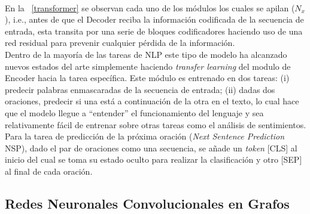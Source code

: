 	\\
	En la \figurename~\ref{transformer} se observan cada uno de los módulos los cuales se apilan ($N_x$), i.e., antes de que el Decoder reciba la información codificada de la secuencia de entrada, esta transita por una serie de bloques codificadores haciendo uso de una red residual para prevenir cualquier pérdida de la información.
	\\
	Dentro de la mayoría de las tareas de NLP este tipo de modelo ha alcanzado nuevos estados del arte simplemente haciendo \textit{transfer learning} del modulo de Encoder hacia la tarea específica. Este módulo es entrenado en dos tareas: (i) predecir palabras enmascaradas de la secuencia de entrada; (ii) dadas dos oraciones, predecir si una está a continuación de la otra en el texto, lo cual hace que el modelo llegue a ``entender'' el funcionamiento del lenguaje y sea relativamente fácil de entrenar sobre otras tareas como el análisis de sentimientos. Para la tarea de predicción de la próxima oración (\textit{Next Sentence Prediction} NSP), dado el par de oraciones como una secuencia, se añade un \textit{token} [CLS] al inicio del cual se toma su estado oculto para realizar la clasificación y otro [SEP] al final de cada oración. 
	
\subsection{Redes Neuronales Convolucionales en Grafos}
	
